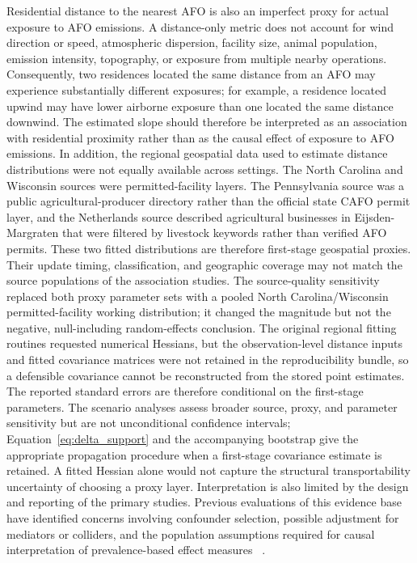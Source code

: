 \documentclass[journal=rsm]{CUP-JNL-DTM}%
\theoremstyle{definition}
\numberwithin{equation}{section}
\begin{document}
Residential distance to the nearest AFO is also an imperfect proxy for actual
exposure to AFO emissions. A distance-only metric does not account for wind
direction or speed, atmospheric dispersion, facility size, animal population,
emission intensity, topography, or exposure from multiple nearby operations.
Consequently, two residences located the same distance from an AFO may experience substantially different exposures; for example, a residence located
upwind may have lower airborne exposure than one located the same distance
downwind. The estimated slope should therefore be interpreted as an association
with residential proximity rather than as the causal effect of exposure to AFO
emissions. In addition, the regional geospatial data used to estimate distance distributions were not equally available across settings. The North Carolina and Wisconsin sources were permitted-facility layers. The Pennsylvania source was a public agricultural-producer directory rather than the official state CAFO permit layer, and the Netherlands source described agricultural businesses in Eijsden-Margraten that were filtered by livestock keywords rather than verified AFO permits. These two fitted distributions are therefore first-stage geospatial proxies. Their update timing, classification, and geographic coverage may not match the source populations of the association studies. The source-quality sensitivity replaced both proxy parameter sets with a pooled North Carolina/Wisconsin permitted-facility working distribution; it changed the magnitude but not the negative, null-including random-effects conclusion. The original regional fitting routines requested numerical Hessians, but the observation-level distance inputs and fitted covariance matrices were not retained in the reproducibility bundle, so a defensible covariance cannot be reconstructed from the stored point estimates. The reported standard errors are therefore conditional on the first-stage parameters. The scenario analyses assess broader source, proxy, and parameter sensitivity but are not unconditional confidence intervals; Equation~\eqref{eq:delta_support} and the accompanying bootstrap give the appropriate propagation procedure when a first-stage covariance estimate is retained. A fitted Hessian alone would not capture the structural transportability uncertainty of choosing a proxy layer. Interpretation is also limited by the design and reporting of the primary studies. Previous evaluations of this evidence base have identified concerns involving confounder selection, possible adjustment for mediators or colliders, and the population assumptions required for causal interpretation of prevalence-based effect measures ~\cite{Martinez2026,FonsecaMartinezDAG2026}.
\end{document}
